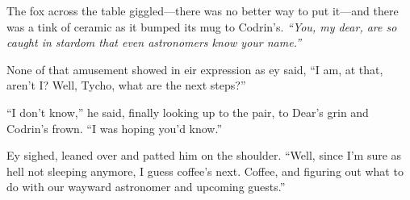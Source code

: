 The fox across the table giggled—there was no better way to put it—and there was a tink of ceramic as it bumped its mug to Codrin's. \emph{``You, my dear, are so caught in stardom that even astronomers know your name.''}

None of that amusement showed in eir expression as ey said, ``I am, at that, aren't I? Well, Tycho, what are the next steps?''

``I don't know,'' he said, finally looking up to the pair, to Dear's grin and Codrin's frown. ``I was hoping you'd know.''

Ey sighed, leaned over and patted him on the shoulder. ``Well, since I'm sure as hell not sleeping anymore, I guess coffee's next. Coffee, and figuring out what to do with our wayward astronomer and upcoming guests.''
